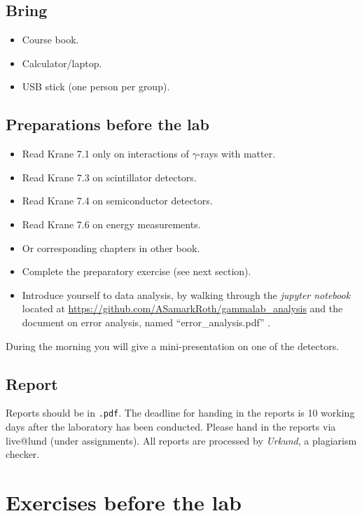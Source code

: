 \documentclass[12pt]{article}
\begin{document}
\subsection*{Bring}
\begin{itemize}
  \item Course book.
  \item Calculator/laptop.
  \item USB stick (one person per group).
\end{itemize}


\subsection*{Preparations before the lab}
\begin{itemize}
  \item Read Krane 7.1 only on interactions of $\gamma$-rays with matter. %
  \item Read Krane 7.3 on scintillator detectors.
  \item Read Krane 7.4 on semiconductor detectors.
  \item Read Krane 7.6 on energy measurements.
  \item Or corresponding chapters in other book.
  \item Complete the preparatory exercise (see next section).
  \item Introduce yourself to data analysis, by walking through the {\it jupyter notebook} located at \href{https://github.com/ASamarkRoth/gammalab\_analysis}{https://github.com/ASamarkRoth/gammalab\_analysis} and the document on error analysis, named ``error\_analysis.pdf'' .

\end{itemize}
During the morning you will give a mini-presentation on one of the detectors.

\subsection*{Report}
Reports should be in \texttt{.pdf}. The deadline for handing in the
reports is 10 working days after the laboratory has been conducted.
Please hand in the reports via live@lund (under assignments).
All reports are processed by \textit{Urkund}, a plagiarism checker.


\section*{Exercises before the lab} \label{sec:exe}
\end{document}
